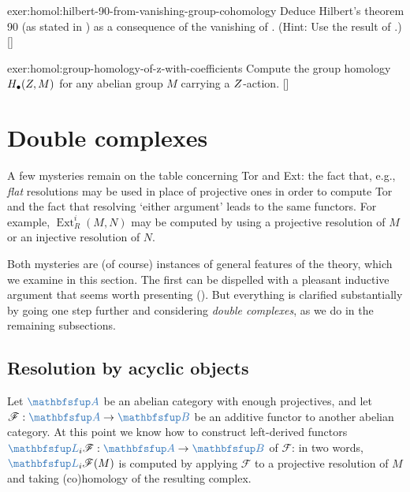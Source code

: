 \begin{exer}{\exerused{}}{exer:homol:hilbert-90-from-vanishing-group-cohomology}
  Deduce Hilbert's theorem 90 (as stated in
  ) as a
  consequence of the vanishing of .  (Hint:
  Use the result of .)
  []
\end{exer}
\begin{exer}{\exerused{}}{exer:homol:group-homology-of-z-with-coefficients}
  Compute the group homology $H_\bullet(Z, M)$ for any abelian group
  $M$ carrying a
  $Z$-action. []
\end{exer}

\section{Double complexes}
\label{sec:homol:double-complexes}

A few mysteries remain on the table concerning Tor and Ext: the fact
that, e.g., \emph{flat} resolutions may be used in place of projective
ones in order to compute Tor and the fact that resolving `either
argument' leads to the same functors. For example,
$\operatorname{Ext}^i_R(M, N)$ may be computed by using a projective
resolution of $M$ or an injective resolution of $N$.

Both mysteries are (of course) instances of general features of the
theory, which we examine in this section. The first can be dispelled
with a pleasant inductive argument that seems worth presenting
(). But everything
is clarified substantially by going one step further and considering
\emph{double complexes}, as we do in the remaining subsections.

\subsection{Resolution by acyclic objects}
\label{subsec:homol:resolution-by-acyclic-objects}

Let $\categ{A}$ be an abelian category with enough projectives, and
let $\mathscr{F} : \categ{A} \to \categ{B}$ be an additive functor to
another abelian category. At this point we know how to construct
left-derived functors
$\categ{L}_i\mathscr{F} : \categ{A} \to \categ{B}$ of $\mathscr{F}$:
in two words, $\categ{L}_i\mathscr{F}(M)$ is computed by applying
$\mathscr{F}$ to a projective resolution of $M$ and taking
(co)homology of the resulting complex.

